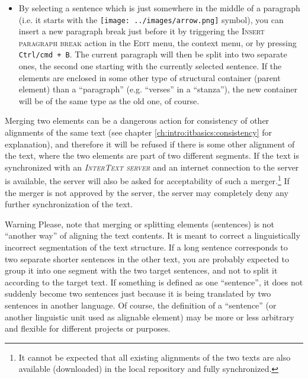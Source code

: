 \documentclass[a4paper,10pt,oneside]{book}
\newcommand{\ITserver}{\textit{\textsc{InterText server}}\xspace}
\newcommand{\keys}[1]{\texttt{#1}}
\newcommand{\menu}[1]{\textsc{#1}}
\begin{document}
\begin{itemize}
 \item By selecting a sentence which is just somewhere in the middle of a paragraph (i.e. it starts with the \texttt{[image: ../images/arrow.png]} symbol), you can insert a new paragraph break just before it by triggering the \menu{Insert paragraph break} action in the \menu{Edit} menu, the context menu, or by pressing \keys{Ctrl/cmd + B}. The current paragraph will then be split into two separate ones, the second one starting with the currently selected sentence. If the elements are enclosed in some other type of structural container (parent element) than a ``paragraph'' (e.g. ``verses'' in a ``stanza''), the new container will be of the same type as the old one, of course.
\end{itemize}

Merging two elements can be a dangerous action for consistency of other alignments of the same text (see chapter \ref{ch:intro:itbasics:consistency} for explanation), and therefore it will be refused if there is some other alignment of the text, where the two elements are part of two different segments. If the text is synchronized with an \ITserver and an internet connection to the server is available, the server will also be asked for acceptability of such a merger.\footnote{It cannot be expected that all existing alignments of the two texts are also available (downloaded) in the local repository and fully synchronized.} If the merger is not approved by the server, the server may completely deny any further synchronization of the text.

\medskip
\begin{bclogo}[couleur = blue!30, arrondi = 0.1, logo = \bcattention,
ombre = true , epOmbre = 0.125, couleurOmbre = black!30, blur, epBord = 0.3, marge = 5]{Warning}\small
Please, note that merging or splitting elements (sentences) is not ``another way'' of aligning the text contents. It is meant to correct a linguistically incorrect segmentation of the text structure. If a long sentence corresponds to two separate shorter sentences in the other text, you are probably expected to group it into one segment with the two target sentences, and not to split it according to the target text. If something is defined as one ``sentence'', it does not suddenly become two sentences just because it is being translated by two sentences in another language. Of course, the definition of a ``sentence'' (or another linguistic unit used as alignable element) may be more or less arbitrary and flexible for different projects or purposes.
\end{bclogo}
\end{document}
